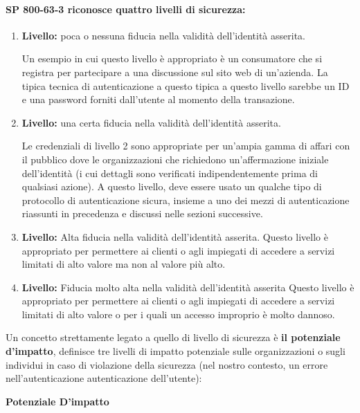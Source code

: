 \paragraph{SP 800-63-3 riconosce quattro livelli di sicurezza:}
\begin{enumerate}
    \item \textbf{Livello:} poca o nessuna fiducia nella validità dell'identità asserita.
    
Un esempio in cui questo livello è appropriato è un consumatore che si registra per partecipare a una discussione sul sito web di un'azienda. La tipica tecnica di autenticazione a questo tipica a questo livello sarebbe un ID e una password forniti dall'utente al momento della transazione.
    
    \item \textbf{Livello:} una certa fiducia nella validità dell'identità asserita.

Le credenziali di livello 2 sono appropriate per un'ampia gamma di affari con il pubblico dove le organizzazioni che richiedono un'affermazione iniziale dell'identità (i cui dettagli sono verificati indipendentemente prima di qualsiasi azione). A questo livello, deve essere usato un qualche tipo di protocollo di autenticazione sicura, insieme a uno dei mezzi di autenticazione riassunti in precedenza e discussi nelle sezioni successive.

    \item \textbf{Livello:} Alta fiducia nella validità dell'identità asserita.
Questo livello è appropriato per permettere ai clienti o agli impiegati di accedere a servizi limitati di alto valore ma non al valore più alto.


    \item\textbf{Livello:} Fiducia molto alta nella validità dell'identità asserita
Questo livello è appropriato per permettere ai clienti o agli impiegati di accedere a servizi limitati di alto valore o per i quali un accesso improprio è molto dannoso.
\end{enumerate}

Un concetto strettamente legato a quello di livello di sicurezza è \textbf{il potenziale d'impatto}, definisce tre livelli di impatto potenziale sulle organizzazioni o sugli individui in caso di violazione della sicurezza (nel nostro contesto, un errore nell'autenticazione autenticazione dell'utente):

\begin{center}
    \textbf{Potenziale D'impatto}
\end{center}

